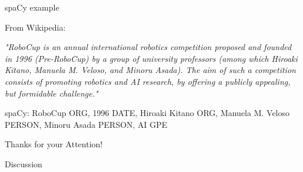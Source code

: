 \documentclass{beamer}
\begin{document}
	\begin{frame}{spaCy example}
		\begin{alertblock}{From Wikipedia:}
		
			\emph{"RoboCup is an annual international robotics competition proposed and founded in 1996 (Pre-RoboCup) by a group of university professors (among which Hiroaki Kitano, Manuela M. Veloso, and Minoru Asada). The aim of such a competition consists of promoting robotics and AI research, by offering a publicly appealing, but formidable challenge."}
			\pause
		\end{alertblock}
		
		\begin{alertblock}{spaCy:}
			RoboCup ORG,
			1996 DATE,
			Hiroaki Kitano ORG,
			Manuela M. Veloso PERSON,
			Minoru Asada PERSON,
			AI GPE
		\end{alertblock}
	\end{frame}
	
	\begin{frame}{}
		\begin{alertblock}{Thanks for your Attention!}
		\end{alertblock}
	\end{frame}
	
	\begin{frame}{}
		\begin{alertblock}{Discussion}
		\end{alertblock}
	\end{frame}
	
\end{document}
